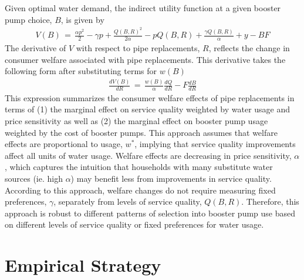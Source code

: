 \documentclass[12pt,table]{article}
\begin{document}
Given optimal water demand, the indirect utility function at a given booster pump choice, $B$, is given by 
\begin{align}
V(B)\,=\,\frac{\alpha p^2}{2} - \gamma p + \frac{Q(B,R)^{2}}{2\alpha} - p Q(B,R) + \frac{\gamma Q(B,R)}{\alpha} + y - B F
\end{align}
The derivative of $V$ with respect to pipe replacements, $R$, reflects the change in consumer welfare associated with pipe replacements.  This derivative takes the following form after substituting terms for $w(B)$
\begin{align}
\label{eq:dvdr}
\frac{dV(B)}{dR}\,=\,\frac{w(B)}{\alpha} \frac{dQ}{dR} - F \frac{dB}{dR}
\end{align}
This expression summarizes the consumer welfare effects of pipe replacements in terms of (1) the marginal effect on service quality weighted by water usage and price sensitivity as well as (2) the marginal effect on booster pump usage weighted by the cost of booster pumps.  This approach assumes that welfare effects are proportional to usage, $w^{*}$, implying that service quality improvements affect all units of water usage.  Welfare effects are decreasing in price sensitivity, $\alpha$, which captures the intuition that households with many substitute water sources (ie. high $\alpha$) may benefit less from improvements in service quality.  According to this approach, welfare changes do not require measuring fixed preferences, $\gamma$, separately from levels of service quality, $Q(B,R)$.  Therefore, this approach is robust to different patterns of selection into booster pump use based on different levels of service quality or fixed preferences for water usage.  



\section{Empirical Strategy}
\end{document}
